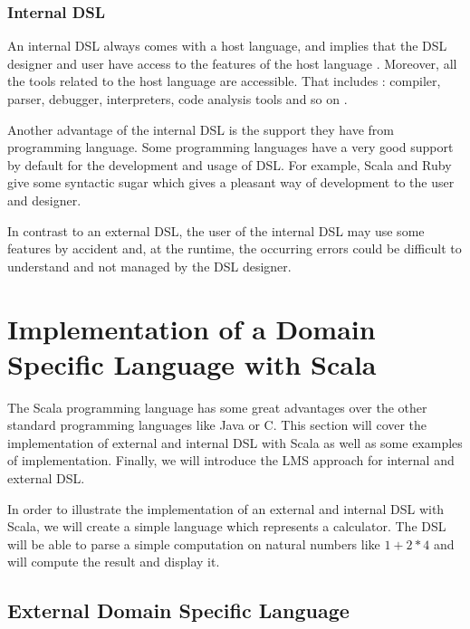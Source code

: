 \subsubsection{Internal \gls{DSL}}
\label{subsubsec:internal_dsl}

An internal \gls{DSL} always comes with a host language, and implies that the
\gls{DSL} designer and user have access to the features of the host language
\cite{strembeckmarkzdunuwe2009}. Moreover, all the tools related to the host
language are accessible. That includes : compiler, parser, debugger,
interpreters, code analysis tools and so on \cite{strembeckmarkzdunuwe2009}.

Another advantage of the internal \gls{DSL} is the support they have from
programming language. Some programming languages have a very good support by
default for the development and usage of \gls{DSL}. For example, Scala and Ruby
give some syntactic sugar which gives a pleasant way of development to the
user and designer.

In contrast to an external \gls{DSL}, the user of the internal \gls{DSL} may use
some features by accident and, at the runtime, the occurring errors could be
difficult to understand and not managed by the \gls{DSL} designer.

\section{Implementation of a Domain Specific Language with Scala}
\label{sec:implementation_of_a_dsl}

The Scala programming language has some great advantages over the other standard
programming languages like Java or C. This section will cover the implementation
of external and internal \gls{DSL} with Scala as well as some examples of
implementation. Finally, we will introduce the \gls{LMS} approach for internal
and external \gls{DSL}.

In order to illustrate the implementation of an external and internal \gls{DSL}
with Scala, we will create a simple language which represents a calculator. The
\gls{DSL} will be able to parse a simple computation on natural numbers like $1 +
2 * 4$ and will compute the result and display it.

\subsection{External Domain Specific Language}
\label{subsec:scala_external_dsl}

